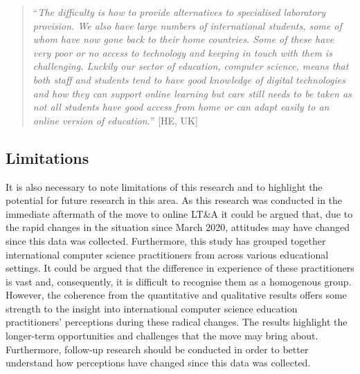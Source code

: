 \documentclass[sigconf]{acmart}
\begin{document}

\begin{quotation}
``{\emph{The difficulty is how to provide alternatives to specialised
laboratory provision. We also have large numbers of international
students, some of whom have now gone back to their home
countries. Some of these have very poor or no access to technology and
keeping in touch with them is challenging. Luckily our sector of
education, computer science, means that both staff and students tend
to have good knowledge of digital technologies and how they can
support online learning but care still needs to be taken as not all
students have good access from home or can adapt easily to an online
version of education.}}'' [HE, UK]
\end{quotation}

\subsection{Limitations}

It is also necessary to note limitations of this research and to
highlight the potential for future research in this area. As this
research was conducted in the immediate aftermath of the move to
online LT\&A it could be argued that, due to the rapid changes in the
situation since March 2020, attitudes may have changed since this data
was collected. Furthermore, this study has grouped together
international computer science practitioners from across various
educational settings. It could be argued that the difference in
experience of these practitioners is vast and, consequently, it is
difficult to recognise them as a homogenous group. However, the
coherence from the quantitative and qualitative results offers some
strength to the insight into international computer science education
practitioners' perceptions during these radical changes. The results
highlight the longer-term opportunities and challenges that the move
may bring about. Furthermore, follow-up research should be conducted
in order to better understand how perceptions have changed since this
data was collected.

\end{document}
